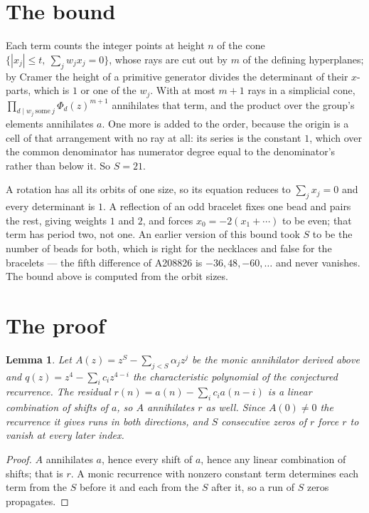 \documentclass[11pt,a4paper]{article}
\theoremstyle{plain}
\newtheorem{lemma}[theorem]{Lemma}
\theoremstyle{definition}
\begin{document}
\section{The bound}

Each term counts the integer points at height $n$ of the cone
$\{|x_j|\le t,\ \sum_j w_jx_j=0\}$, whose rays are cut out by $m$ of the defining
hyperplanes; by Cramer the height of a primitive generator divides the determinant of their
$x$-parts, which is $1$ or one of the $w_j$. With at most $m+1$ rays in a simplicial cone,
$\prod_{d\mid w_j\ \text{some}\ j}\Phi_d(z)^{m+1}$ annihilates that term, and the product
over the group's elements annihilates $a$. One more is added to the order, because the origin
is a cell of that arrangement with no ray at all: its series is the constant $1$, which over
the common denominator has numerator degree equal to the denominator's rather than below it.
So $S=21$.

A rotation has all its orbits of one size, so its equation reduces to $\sum_jx_j=0$ and every
determinant is $1$. A reflection of an odd bracelet fixes one bead and pairs the rest, giving
weights $1$ and $2$, and forces $x_0=-2(x_1+\cdots)$ to be even; that term has period two, not
one. An earlier version of this bound took $S$ to be the number of beads for both, which is
right for the necklaces and false for the bracelets --- the fifth difference of A208826 is
$-36, 48, -60, \dots$ and never vanishes. The bound above is computed from the orbit sizes.

\section{The proof}

\begin{lemma}\label{lem:crit}
Let $A(z)=z^S-\sum_{j<S}\alpha_jz^{j}$ be the monic annihilator derived above and
$q(z)=z^{4}-\sum_ic_iz^{4-i}$ the characteristic polynomial of the conjectured
recurrence. The residual $r(n)=a(n)-\sum_ic_ia(n-i)$ is a linear combination of shifts of $a$,
so $A$ annihilates $r$ as well. Since $A(0)\ne0$ the recurrence it gives runs in both
directions, and $S$ consecutive zeros of $r$ force $r$ to vanish at every later index.
\end{lemma}

\begin{proof}
$A$ annihilates $a$, hence every shift of $a$, hence any linear combination of shifts; that is
$r$. A monic recurrence with nonzero constant term determines each term from the $S$ before it
and each from the $S$ after it, so a run of $S$ zeros propagates.
\end{proof}
\end{document}
